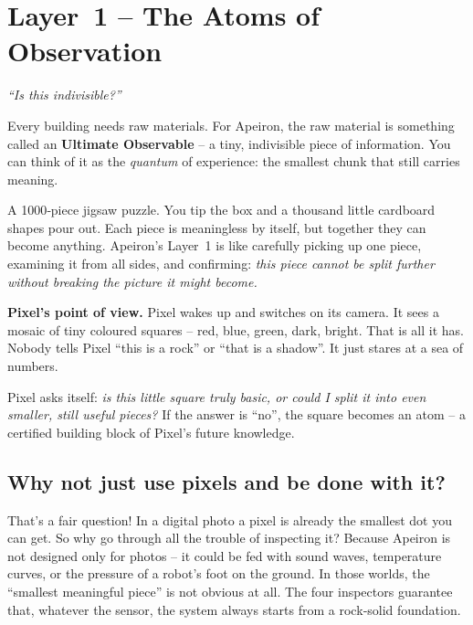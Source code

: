 \section{Layer~1 – The Atoms of Observation}
\label{sec:layer1}

\begin{tcolorbox}[colback=blue!5, colframe=blue!60, title=\textbf{Superpower: The Splitter}]
\begin{center}
\textit{“Is this indivisible?”}
\end{center}
\end{tcolorbox}

Every building needs raw materials.  For Apeiron, the raw material is
something called an \textbf{Ultimate Observable} – a tiny, indivisible
piece of information.  You can think of it as the \emph{quantum} of
experience: the smallest chunk that still carries meaning.

\begin{tcolorbox}[colback=yellow!5, colframe=yellow!80, title=Real‑life analogy]
A 1000‑piece jigsaw puzzle.  You tip the box and a thousand little
cardboard shapes pour out.  Each piece is meaningless by itself, but
together they can become anything.  Apeiron’s Layer~1 is like
carefully picking up one piece, examining it from all sides, and
confirming: \emph{this piece cannot be split further without breaking
the picture it might become.}
\end{tcolorbox}

\textbf{Pixel’s point of view.}
Pixel wakes up and switches on its camera.  It sees a mosaic of tiny
coloured squares – red, blue, green, dark, bright.  That is all it has.
Nobody tells Pixel “this is a rock” or “that is a shadow”.  It just
stares at a sea of numbers.

Pixel asks itself: \emph{is this little square truly basic, or could
I split it into even smaller, still useful pieces?}  If the answer is
“no”, the square becomes an atom – a certified building block of
Pixel’s future knowledge.

\subsection*{Why not just use pixels and be done with it?}

That’s a fair question!  In a digital photo a pixel is already the
smallest dot you can get.  So why go through all the trouble of
inspecting it?  Because Apeiron is not designed only for photos – it
could be fed with sound waves, temperature curves, or the pressure of
a robot’s foot on the ground.  In those worlds, the “smallest
meaningful piece” is not obvious at all.  The four inspectors
guarantee that, whatever the sensor, the system always starts from a
rock‑solid foundation.

